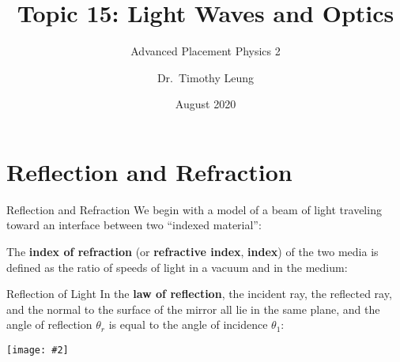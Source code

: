 \documentclass[12pt,compress,aspectratio=169]{beamer}
\title{Topic 15: Light Waves and Optics}
\subtitle{Advanced Placement Physics 2}
\author[TML]{Dr.\ Timothy Leung}
\institute{Olympiads School\\Toronto, Ontario, Canada}
\date{August 2020}
\newcommand{\pic}[2]{\texttt{[image: \#2]}}
\newcommand{\eq}[2]{\vspace{#1}{\LARGE\begin{displaymath}#2\end{displaymath}}}
\begin{document}
\begin{frame}
  \maketitle
\end{frame}



\section{Reflection and Refraction}

\begin{frame}{Reflection and Refraction}
  We begin with a model of a beam of light traveling toward an interface
  between two ``indexed material'':
  \begin{center}
  \end{center}
  The \textbf{index of refraction} (or \textbf{refractive index},
  \textbf{index}) of the two media is defined as the ratio of speeds of
  light in a vacuum and in the medium:

  \eq{-.2in}{
    n=\frac{c}{v}\geq 1
  }
\end{frame}

\begin{frame}{Reflection of Light}
  In the \textbf{law of reflection}, the incident ray, the reflected ray, and
  the normal to the surface of the mirror all lie in the same plane, and the
  angle of reflection $\theta_r$ is equal to the angle of incidence $\theta_1$:

  \eq{-.25in}{
    \boxed{\theta_r=\theta_1}
  }
  
  \begin{center}
    \vspace{-.2in}
    \pic{.6}{graphics/Types-of-reflection.png}
  \end{center}
\end{frame}
\end{document}
